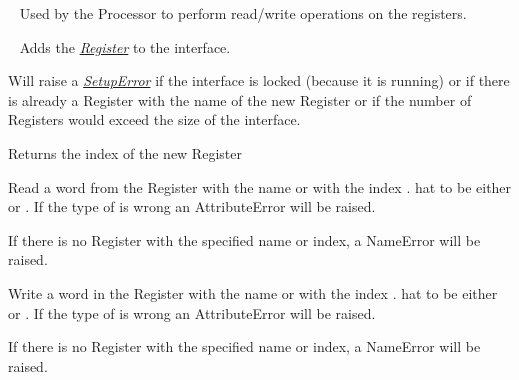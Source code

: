 \documentclass[letterpaper,10pt,english]{sphinxmanual}
\begin{document}

\begin{fulllineitems}
\label{core:py_register_machine2.core.processor.RegisterInterface}~\label{core:registerinterface}
Used by the Processor to perform read/write
operations on the registers.

\begin{fulllineitems}
\label{core:py_register_machine2.core.processor.RegisterInterface.add_register}~\label{core:add-register}
Adds the {\hyperref[core:register]{\emph{Register}}}  to the interface.

Will raise a {\hyperref[core:setuperror]{\emph{SetupError}}} if the interface is locked (because it is running) or if
there is already a Register with the name of the new Register or if
the number of Registers would exceed the size of the interface.

Returns the index of the new Register

\end{fulllineitems}


\begin{fulllineitems}
\label{core:py_register_machine2.core.processor.RegisterInterface.read}
Read a word from the Register with the name  or with the index .
 hat to be either  or . If the type of 
is wrong an AttributeError will be raised.

If there is no Register with the specified name or index, a NameError will be raised.

\end{fulllineitems}


\begin{fulllineitems}
\label{core:py_register_machine2.core.processor.RegisterInterface.write}
Write a word in the Register with the name  or with the index .
 hat to be either  or . If the type of 
is wrong an AttributeError will be raised.

If there is no Register with the specified name or index, a NameError will be raised.

\end{fulllineitems}


\end{fulllineitems}
\end{document}
